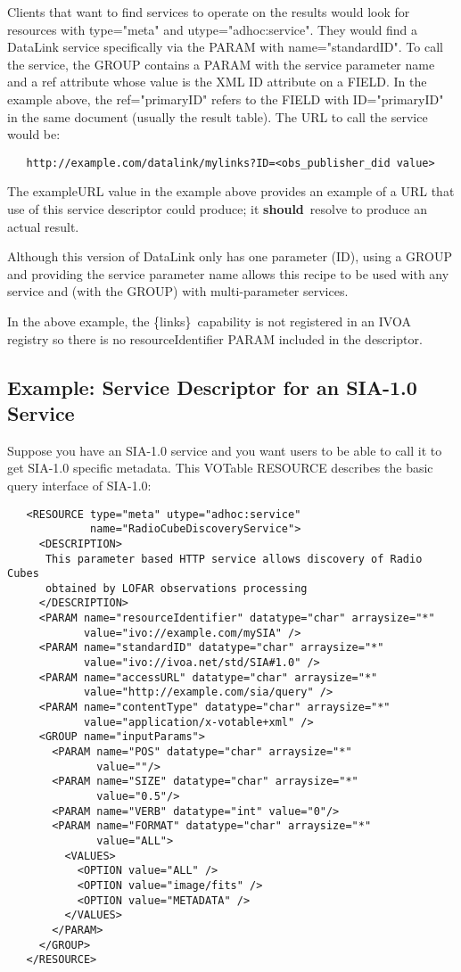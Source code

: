 \documentclass[11pt,a4paper]{ivoa}
\newcommand{\blinks}{\{links\}}
\newcommand{\attval}[2]{#1={\allowbreak}{"}#2{"}}
\newcommand{\rfcshould}{\textbf{should}}
\begin{document}
Clients that want to find services to operate on the results would look
for resources with \attval{type}{meta} and \attval{utype}{adhoc:service}.
They would find a DataLink service specifically via the PARAM with
\attval{name}{standardID}. To call the service, the GROUP contains a PARAM
with the service parameter name and a ref attribute whose value is the
XML ID attribute on a FIELD. In the example above, the \attval{ref}{primaryID}
refers to the FIELD with \attval{ID}{primaryID} in the same document (usually
the result table). The URL to call the service would be:
\begin{verbatim}
   http://example.com/datalink/mylinks?ID=<obs_publisher_did value>
\end{verbatim}

The exampleURL value in the example above provides an example
of a URL that use of this service descriptor could produce;
it \rfcshould\ resolve to produce an actual result.

Although this version of DataLink only has one parameter (ID), using a
GROUP and providing the service parameter name allows this recipe to be
used with any service and (with the GROUP) with multi-parameter services.

In the above example, the \blinks\ capability is not registered in an
IVOA registry so there is no resourceIdentifier PARAM included in the
descriptor.


\subsection{Example: Service Descriptor for an SIA-1.0 Service}

Suppose you have an SIA-1.0 service and you want users to be able to
call it to get SIA-1.0 specific metadata. This VOTable RESOURCE describes
the basic query interface of SIA-1.0:
\begin{verbatim}
   <RESOURCE type="meta" utype="adhoc:service"
             name="RadioCubeDiscoveryService">
     <DESCRIPTION>
      This parameter based HTTP service allows discovery of Radio Cubes
      obtained by LOFAR observations processing
     </DESCRIPTION>
     <PARAM name="resourceIdentifier" datatype="char" arraysize="*"
            value="ivo://example.com/mySIA" />
     <PARAM name="standardID" datatype="char" arraysize="*"
            value="ivo://ivoa.net/std/SIA#1.0" />
     <PARAM name="accessURL" datatype="char" arraysize="*"
            value="http://example.com/sia/query" />
     <PARAM name="contentType" datatype="char" arraysize="*"
            value="application/x-votable+xml" />
     <GROUP name="inputParams">
       <PARAM name="POS" datatype="char" arraysize="*"
              value=""/>
       <PARAM name="SIZE" datatype="char" arraysize="*"
              value="0.5"/>
       <PARAM name="VERB" datatype="int" value="0"/>
       <PARAM name="FORMAT" datatype="char" arraysize="*"
              value="ALL">
         <VALUES>
           <OPTION value="ALL" />
           <OPTION value="image/fits" />
           <OPTION value="METADATA" />
         </VALUES>
       </PARAM>
     </GROUP>
   </RESOURCE>
\end{verbatim}
\end{document}
